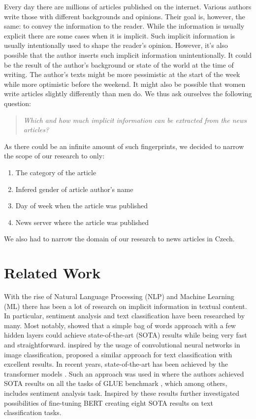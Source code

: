 Every day there are millions of articles published on the internet. Various authors write those
with different backgrounds and opinions. Their goal is, however, the same: to convey the information to the reader.
While the information is usually explicit there are some cases when it is implicit. Such implicit information 
is usually intentionally used to shape the reader's opinion. However, it's also possible
that the author inserts such implicit information unintentionally. It could
be the result of the author's background or state of the world at the time of writing.
The author's texts might be more pessimistic at the start of the week while more optimistic before the weekend.
It might also be possible that women write articles slightly differently than men do.
We thus ask ourselves the following question:
\begin{quote}
    \textit{Which and how much implicit information can be extracted from the news articles?}
\end{quote}

As there could be an infinite amount of such fingerprints, we decided to narrow the scope of our research to only:
\begin{enumerate}
    \item The category of the article
    \item Infered gender of article author's name
    \item Day of week when the article was published
    \item News server where the article was published
\end{enumerate}
We also had to narrow the domain of our research to news articles in Czech.

\section*{Related Work}
With the rise of Natural Language Processing (NLP) and Machine Learning (ML)
there has been a lot of research on implicit information in textual content.
In particular, sentiment analysis and text classification have been researched by many.
Most notably, \cite{joulinBagTricksEfficient2016} showed that a simple bag of words approach
with a few hidden layers could achieve state-of-the-art (SOTA) results while being very fast and straightforward.
\cite{zhangTextUnderstandingScratch2016} inspired by the usage of convolutional neural networks in image classification,
proposed a similar approach for text classification with excellent results.
In recent years, state-of-the-art has been achieved by the transformer models \cite{vaswaniAttentionAllYou2017d}.
Such an approach was used in \cite{devlinBERTPretrainingDeep2019a} where the authors achieved SOTA results on
all the tasks of GLUE benchmark \cite{wangGLUEMultiTaskBenchmark2019}, which among others, includes 
sentiment analysis task. Inspired by these results \cite{sunHowFineTuneBERT2020} further investigated possibilities
of fine-tuning BERT creating eight SOTA results on text classification tasks.

